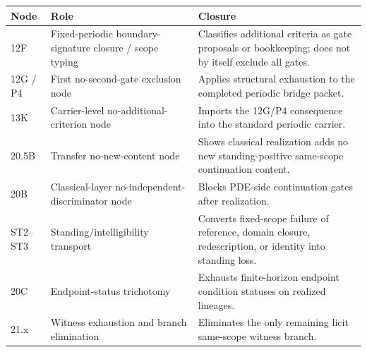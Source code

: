 \begin{center}
\scriptsize
\renewcommand{\arraystretch}{1.12}
\setlength{\tabcolsep}{3pt}
\begin{tabularx}{0.98\textwidth}{@{}L{0.15\textwidth}L{0.28\textwidth}Y@{}}
\toprule
\textbf{Node} & \textbf{Role} & \textbf{Closure}\\
\midrule
12F & Fixed-periodic boundary-signature closure / scope typing & Classifies additional criteria as gate proposals or bookkeeping; does not by itself exclude all gates.\\
12G / P4 & First no-second-gate exclusion node & Applies structural exhaustion to the completed periodic bridge packet.\\
13K & Carrier-level no-additional-criterion node & Imports the 12G/P4 consequence into the standard periodic carrier.\\
20.5B & Transfer no-new-content node & Shows classical realization adds no new standing-positive same-scope continuation content.\\
20B & Classical-layer no-independent-discriminator node & Blocks PDE-side continuation gates after realization.\\
ST2--ST3 & Standing/intelligibility transport & Converts fixed-scope failure of reference, domain closure, redescription, or identity into standing loss.\\
20C & Endpoint-status trichotomy & Exhausts finite-horizon endpoint condition statuses on realized lineages.\\
21.x & Witness exhaustion and branch elimination & Eliminates the only remaining licit same-scope witness branch.\\
\bottomrule
\end{tabularx}
\end{center}

